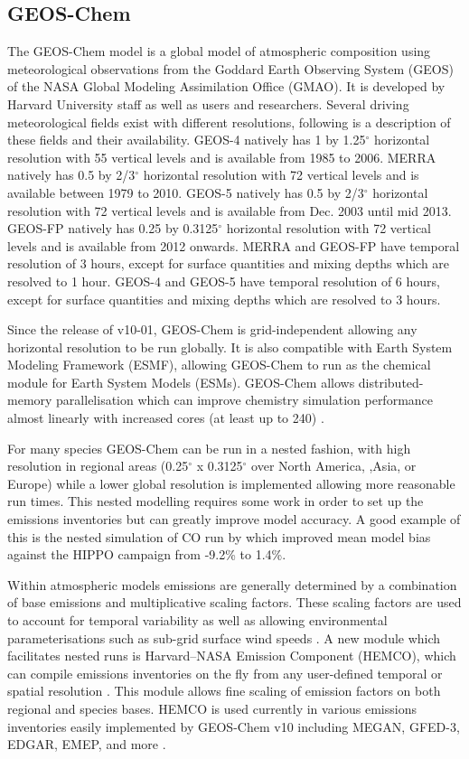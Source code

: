 \subsection{GEOS-Chem}

The GEOS-Chem model is a global model of atmospheric composition using meteorological observations from the Goddard Earth Observing System (GEOS) of the NASA Global Modeling Assimilation Office (GMAO). 
It is developed by Harvard University staff as well as users and researchers. 
Several driving meteorological fields exist with different resolutions, following is a description of these fields and their availability. 
GEOS-4 natively has 1 by 1.25$^\circ$ horizontal resolution with 55 vertical levels and is available from 1985 to 2006. 
MERRA natively has 0.5 by 2/3$^\circ$ horizontal resolution with 72 vertical levels and is available between 1979 to 2010.
GEOS-5 natively has 0.5 by 2/3$^\circ$ horizontal resolution with 72 vertical levels and is available from Dec. 2003 until mid 2013.
GEOS-FP natively has 0.25 by 0.3125$^\circ$ horizontal resolution with 72 vertical levels and is available from 2012 onwards.
MERRA and GEOS-FP have temporal resolution of 3 hours, except for surface quantities and mixing depths which are resolved to 1 hour.
GEOS-4 and GEOS-5 have temporal resolution of 6 hours, except for surface quantities and mixing depths which are resolved to 3 hours.

Since the release of v10-01, GEOS-Chem is grid-independent allowing any horizontal resolution to be run globally. 
It is also compatible with Earth System Modeling Framework (ESMF), allowing GEOS-Chem to run as the chemical module for Earth System Models (ESMs). 
GEOS-Chem allows distributed-memory parallelisation which can improve chemistry simulation performance almost linearly with increased cores (at least up to 240) \cite{Long_2015}.

For many species GEOS-Chem can be run in a nested fashion, with high resolution in regional areas (0.25$^{\circ}$ x 0.3125$^{\circ}$ over North America, ,Asia, or Europe) while a lower global resolution is implemented allowing more reasonable run times.
This nested modelling requires some work in order to set up the emissions inventories but can greatly improve model accuracy.
A good example of this is the nested simulation of CO run by \citet{Yan_2014} which improved mean model bias against the HIPPO campaign from -9.2\% to 1.4\%.

Within atmospheric models emissions are generally determined by a combination of base emissions and multiplicative scaling factors. 
These scaling factors are used to account for temporal variability as well as allowing environmental parameterisations such as sub-grid surface wind speeds \cite{Ridley_2013,Zender_2003}.
A new module which facilitates nested runs is Harvard–NASA Emission Component (HEMCO), which can compile emissions inventories on the fly from any user-defined temporal or spatial resolution \cite{Keller_2014}.
This module allows fine scaling of emission factors on both regional and species bases.
HEMCO is used currently in various emissions inventories easily implemented by GEOS-Chem v10 including MEGAN, GFED-3, EDGAR, EMEP, and more \cite{Keller_2014}.
  
  
  
  